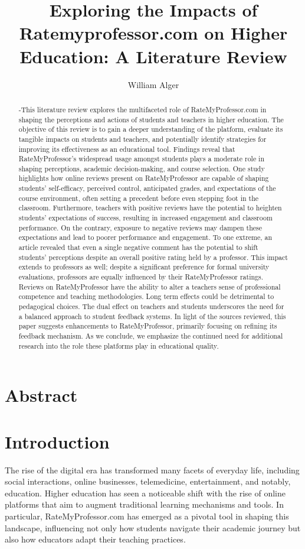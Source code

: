 \documentclass[man,12pt]{apa7}
\title{Exploring the Impacts of Ratemyprofessor.com on Higher Education: A Literature Review}
\author{William Alger}
\affiliation{Northern Kentucky University}
\begin{document}
\maketitle

\section{Abstract}
\begin{abstract}
-This literature review explores the multifaceted role of RateMyProfessor.com in shaping the perceptions and actions of students and teachers in higher education. 
The objective of this review is to gain a deeper understanding of the platform, evaluate its tangible impacts on students and teachers, and potentially identify strategies for improving its effectiveness as an educational tool. Findings reveal that RateMyProfessor's widespread usage amongst students plays a moderate role in shaping perceptions, academic decision-making, and course selection. One study highlights how online reviews present on RateMyProfessor are capable of shaping students' self-efficacy, perceived control, anticipated grades, and expectations of the course environment, often setting a precedent before even stepping foot in the classroom. Furthermore, teachers with positive reviews have the potential to heighten students' expectations of success, resulting in increased engagement and classroom performance. On the contrary, exposure to negative reviews may dampen these expectations and lead to poorer performance and engagement. To one extreme, an article revealed that even a single negative comment has the potential to shift students' perceptions despite an overall positive rating held by a professor. This impact extends to professors as well; despite a significant preference for formal university evaluations, professors are equally influenced by their RateMyProfessor ratings. Reviews on RateMyProfessor have the ability to alter a teachers sense of professional competence and teaching methodologies. Long term effects could be detrimental to pedagogical choices. The dual effect on teachers and students underscores the need for a balanced approach to student feedback systems. In light of the sources reviewed, this paper suggests enhancements to RateMyProfessor, primarily focusing on refining its feedback mechanism. As we conclude, we emphasize the continued need for additional research into the role these platforms play in educational quality.
\end{abstract}

\section{Introduction}
The rise of the digital era has transformed many facets of everyday life, including social interactions, online businesses, telemedicine, entertainment, and notably, education. Higher education has seen a noticeable shift with the rise of online platforms that aim to augment traditional learning mechanisms and tools. In particular, RateMyProfessor.com has emerged as a pivotal tool in shaping this landscape, influencing not only how students navigate their academic journey but also how educators adapt their teaching practices.
\end{document}
